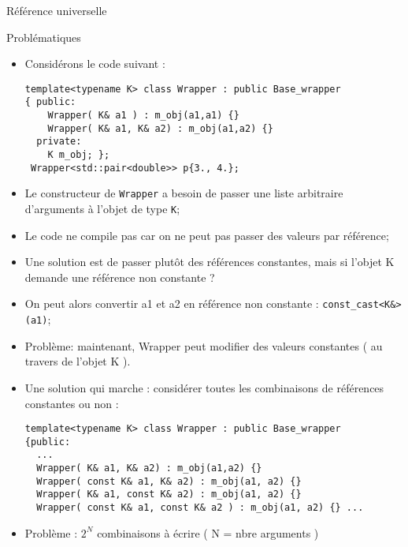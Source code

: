 \documentclass[handout,10pt]{beamer}
\begin{document}
\begin{frame}[fragile]{Référence universelle}
\tiny
 \begin{block}{Problématiques}
  \begin{itemize}
  \item Considérons le code suivant :
\begin{lstlisting}
template<typename K> class Wrapper : public Base_wrapper
{ public:
    Wrapper( K& a1 ) : m_obj(a1,a1) {}
    Wrapper( K& a1, K& a2) : m_obj(a1,a2) {}
  private:
    K m_obj; };
 Wrapper<std::pair<double>> p{3., 4.};
\end{lstlisting}
\item Le constructeur de \lstinline$Wrapper$ a besoin de passer une liste arbitraire d'arguments à l'objet de type \lstinline$K$;
\item Le code ne compile pas car on ne peut pas passer des valeurs par référence;
\item Une solution est de passer plutôt des références constantes, mais si l'objet K demande une référence non constante ?
\item On peut alors convertir a1 et a2 en référence non constante : \lstinline$const_cast<K&>(a1)$;
\item Problème:  maintenant, Wrapper peut modifier des valeurs constantes ( au travers de l'objet K ).
\item Une solution qui marche : considérer toutes les combinaisons de références constantes ou non :
\begin{lstlisting}
template<typename K> class Wrapper : public Base_wrapper
{public:
  ...
  Wrapper( K& a1, K& a2) : m_obj(a1,a2) {}
  Wrapper( const K& a1, K& a2) : m_obj(a1, a2) {}
  Wrapper( K& a1, const K& a2) : m_obj(a1, a2) {}
  Wrapper( const K& a1, const K& a2 ) : m_obj(a1, a2) {} ... \end{lstlisting}
\item Problème : $2^{N}$ combinaisons à écrire ( N = nbre arguments )
 \end{itemize}
 \end{block}
\end{frame}
\end{document}
